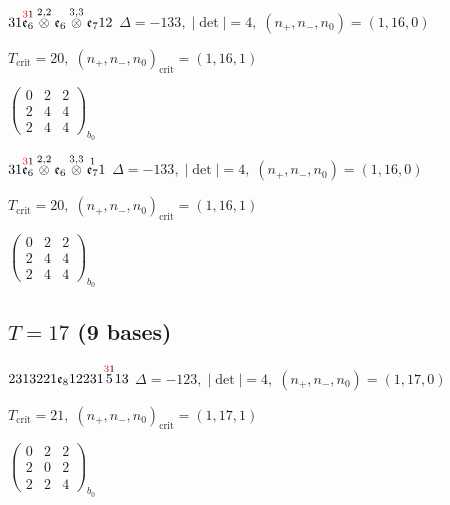 \documentclass[10pt]{article}
\begin{document}
\smallskip

$31\overset{\textcolor{red}{3}1}{\mathfrak{e}_6}\overset{2,2}{\otimes}\mathfrak{e}_6\overset{3,3}{\otimes}\mathfrak{e}_712$ \quad $\Delta=-133,\; |\det|=4,\; (n_+,n_-,n_0)=(1,16,0)$

\hspace{1em}$T_{\text{crit}}=20,\; (n_+,n_-,n_0)_{\text{crit}}=(1,16,1)$

\hspace{2em}$\left(\begin{smallmatrix}0 & 2 & 2 \\ 2 & 4 & 4 \\ 2 & 4 & 4\end{smallmatrix}\right)_{\!b_0}$

\smallskip

$31\overset{\textcolor{red}{3}1}{\mathfrak{e}_6}\overset{2,2}{\otimes}\mathfrak{e}_6\overset{3,3}{\otimes}\overset{1}{\mathfrak{e}_7}1$ \quad $\Delta=-133,\; |\det|=4,\; (n_+,n_-,n_0)=(1,16,0)$

\hspace{1em}$T_{\text{crit}}=20,\; (n_+,n_-,n_0)_{\text{crit}}=(1,16,1)$

\hspace{2em}$\left(\begin{smallmatrix}0 & 2 & 2 \\ 2 & 4 & 4 \\ 2 & 4 & 4\end{smallmatrix}\right)_{\!b_0}$


\subsection*{$T = 17$ \quad (9 bases)}
\smallskip

$2313221\mathfrak{e}_812231\overset{\textcolor{red}{3}1}{5}13$ \quad $\Delta=-123,\; |\det|=4,\; (n_+,n_-,n_0)=(1,17,0)$

\hspace{1em}$T_{\text{crit}}=21,\; (n_+,n_-,n_0)_{\text{crit}}=(1,17,1)$

\hspace{2em}$\left(\begin{smallmatrix}0 & 2 & 2 \\ 2 & 0 & 2 \\ 2 & 2 & 4\end{smallmatrix}\right)_{\!b_0}$
\end{document}
